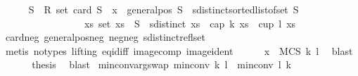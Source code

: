 \begin{isabellebody}
\isanewline
\ \ \ \ \isamarkupfalse%
\ {\isachardoublequoteopen}{\isasymforall}S\ {\isacharcolon}{\kern0pt}{\isacharcolon}{\kern0pt}\ R{}\ set{\isachardot}{\kern0pt}{\isacharparenleft}{\kern0pt}\ card\ S\ {\isasymge}\ x\ {\isasymand}\ general{\isacharunderscore}{\kern0pt}pos\ S\ {\isasymand}\ sdistinct{\isacharparenleft}{\kern0pt}sorted{\isacharunderscore}{\kern0pt}list{\isacharunderscore}{\kern0pt}of{\isacharunderscore}{\kern0pt}set\ S{\isacharparenright}{\kern0pt}{\isacharparenright}{\kern0pt}\isanewline
\ \ \ \ \ \ \ \ \ \ \ \ \ \ \ \ {\isasymlongrightarrow}\ {\isacharparenleft}{\kern0pt}{\isasymexists}xs{\isachardot}{\kern0pt}\ set\ xs\ {\isasymsubseteq}\ S\ {\isasymand}\ sdistinct\ xs\ {\isasymand}\ {\isacharparenleft}{\kern0pt}cap\ k\ xs\ {\isasymor}\ cup\ l\ xs{\isacharparenright}{\kern0pt}{\isacharparenright}{\kern0pt}{\isachardoublequoteclose}\isanewline
\ \ \ \ \ \ \isamarkupfalse%
\ card{\isacharunderscore}{\kern0pt}neg\ general{\isacharunderscore}{\kern0pt}pos{\isacharunderscore}{\kern0pt}neg\ neg{\isacharunderscore}{\kern0pt}neg\ sdistinct{\isacharunderscore}{\kern0pt}refl{\isacharunderscore}{\kern0pt}set\isanewline
\ \ \ \ \ \ \isamarkupfalse%
\ {\isacharparenleft}{\kern0pt}metis\ {\isacharparenleft}{\kern0pt}no{\isacharunderscore}{\kern0pt}types{\isacharcomma}{\kern0pt}\ lifting{\isacharparenright}{\kern0pt}\ eq{\isacharunderscore}{\kern0pt}id{\isacharunderscore}{\kern0pt}iff\ image{\isacharunderscore}{\kern0pt}comp\ image{\isacharunderscore}{\kern0pt}ident{\isacharparenright}{\kern0pt}\isanewline
\isanewline
\ \ \ \ \isamarkupfalse%
\ {\isachardoublequoteopen}x\ {\isasymin}\ {\isacharquery}{\kern0pt}MCS\ k\ l{\isachardoublequoteclose}\ \isamarkupfalse%
\ blast\isanewline
\ \ \isamarkupfalse%
\isanewline
\isanewline
\ \ \isamarkupfalse%
\ {\isacharquery}{\kern0pt}thesis\ \isamarkupfalse%
\ blast\isanewline
\isanewline
{}\isamarkupfalse%
%
\endisatagproof
{\isafoldproof}%
%
\isadelimproof
\isanewline
%
\endisadelimproof
\isanewline
{}\isamarkupfalse%
\ min{\isacharunderscore}{\kern0pt}conv{\isacharunderscore}{\kern0pt}arg{\isacharunderscore}{\kern0pt}swap{\isacharcolon}{\kern0pt}\ {\isachardoublequoteopen}min{\isacharunderscore}{\kern0pt}conv\ k\ l\ {\isacharequal}{\kern0pt}\ min{\isacharunderscore}{\kern0pt}conv\ l\ k{\isachardoublequoteclose}\isanewline
%
\isadelimproof
\ \ %
\endisadelimproof
%
\isatagproof
{}\isamarkupfalse%

\end{isabellebody}
